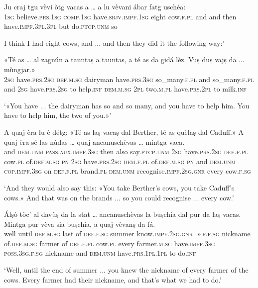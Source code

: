 	\begin{linenumbers}
\gll	Ju craj tgu vèvi òtg vacas a … a lu vèvani ábar fatg uschéa:\\
 \textsc{1sg} believe.\textsc{prs.1sg} \textsc{comp.1sg} have.\textsc{sbjv.impf.1sg} eight cow.\textsc{f.pl} and {} and then have.\textsc{impf.3pl.3pl} but  do.\textsc{ptcp.unm} so\\
\end{linenumbers}
\medskip
\glt  I think I had eight cows, and ... and then they did it the following way:'
\medskip

\begin{linenumbers}
	\gll «Té as … al zagnún a tauntaṣ a tauntas, a té as da gidá lèz. Vuṣ duṣ vajṣ da ... mùngjar.»\\
	\textsc{2sg} have.\textsc{prs.2sg} {} \textsc{def.m.sg} dairyman have\textsc{.prs.3sg} so\_many.\textsc{f.pl} and so\_many.\textsc{f.pl} and \textsc{2sg} have.\textsc{prs.2sg} to help.\textsc{inf} \textsc{dem.m.sg} \textsc{2pl} two.\textsc{m.pl} have.\textsc{prs.2pl} to {} milk.\textsc{inf}\\
\end{linenumbers}
\medskip
	\glt `«You have ... the dairyman has so and so many, and you have to help him. You have to help him, the two of you.»'
\medskip

\begin{linenumbers}
	\gll A quaj èra lu è détg: «Té as laṣ vacaṣ dal Berther, té as quèlaṣ dal Caduff.» A quaj èra sé las nùdas … quaj ancanuschèvas … mintga vaca.\\
	and \textsc{dem.unm} \textsc{pass.aux.impf.3sg} then also say.\textsc{ptcp.unm} \textsc{2sg} have.\textsc{prs.2sg} \textsc{def.f.pl} cow.\textsc{pl} of.\textsc{def.m.sg} \textsc{pn} \textsc{2sg} have.\textsc{prs.2sg} \textsc{dem.f.pl} of.\textsc{def.m.sg} \textsc{pn} and \textsc{dem.unm} \textsc{cop.impf.3sg} on \textsc{def.f.pl} brand.\textsc{pl} {} \textsc{dem.unm} recognise.\textsc{impf.2sg.gnr} {} every cow.\textsc{f.sg}\\
\end{linenumbers}
\medskip
\glt `And they would also say this: «You take Berther's cows, you take Caduff's cows.» And that was on the brands ... so you could recognise ... every cow.'
\medskip

\begin{linenumbers}
	\gll Álṣò tòc’ al davùṣ da la stat … ancanuschèvas la buṣchia dal pur da laṣ vacas. Mintga pur vèva sia buṣchia, a quaj vèvanṣ da fá.\\
	well until \textsc{def.m.sg} last of \textsc{def.f.sg} summer {} know.\textsc{impf.2sg.gnr} \textsc{def.f.sg} nickname of.\textsc{def.m.sg} farmer of \textsc{def.f.pl} cow.\textsc{pl} every farmer.\textsc{m.sg} have.\textsc{impf.3sg} \textsc{poss.3sg.f.sg} nickname and \textsc{dem.unm} have.\textsc{prs.1pl.1pl} to do.\textsc{inf}\\
\end{linenumbers}
\medskip
\glt `Well, until the end of summer ... you knew the nickname of every farmer of the cows. Every farmer had their nickname, and that's what we had to do.'
\medskip

